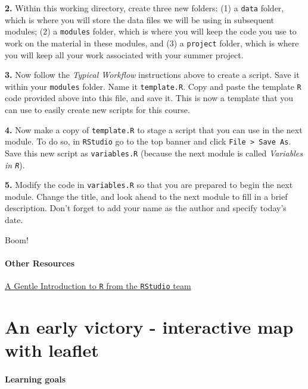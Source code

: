 \documentclass[
]{book}
\begin{document}
\textbf{2.} Within this working directory, create three new folders: (1) a \texttt{data} folder, which is where you will store the data files we will be using in subsequent modules; (2) a \texttt{modules} folder, which is where you will keep the code you use to work on the material in these modules, and (3) a \texttt{project} folder, which is where you will keep all your work associated with your summer project.

\textbf{3.} Now follow the \emph{Typical Workflow} instructions above to create a script. Save it within your \texttt{modules} folder. Name it \texttt{template.R}. Copy and paste the template \texttt{R} code provided above into this file, and save it. This is now a template that you can use to easily create new scripts for this course.

\textbf{4.} Now make a copy of \texttt{template.R} to stage a script that you can use in the next module. To do so, in \texttt{RStudio} go to the top banner and click \texttt{File\ \textgreater{}\ Save\ As}. Save this new script as \texttt{variables.R} (because the next module is called \emph{Variables in \texttt{R}}).

\textbf{5.} Modify the code in \texttt{variables.R} so that you are prepared to begin the next module. Change the title, and look ahead to the next module to fill in a brief description. Don't forget to add your name as the author and specify today's date.

Boom!

\hypertarget{other-resources-1}{%
\subsubsection*{Other Resources}\label{other-resources-1}}

\href{https://www.rstudio.com/resources/webinars/a-gentle-introduction-to-tidy-statistics-in-r/}{A Gentle Introduction to \texttt{R} from the \texttt{RStudio} team}

\hypertarget{an-early-victory---interactive-map-with-leaflet}{%
\chapter{An early victory - interactive map with leaflet}\label{an-early-victory---interactive-map-with-leaflet}}

\hypertarget{learning-goals-2}{%
\subsubsection*{Learning goals}\label{learning-goals-2}}
\end{document}
